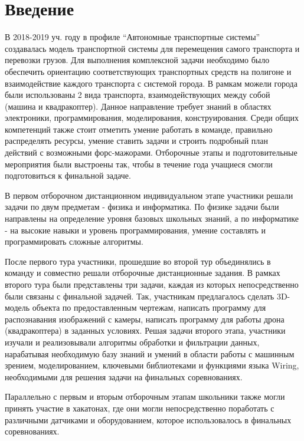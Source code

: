 %

\section*{Введение}

В 2018-2019 уч. году в профиле “Автономные транспортные системы” создавалась модель транспортной системы для перемещения самого транспорта и перевозки грузов. Для выполнения комплексной задачи необходимо было обеспечить ориентацию соответствующих транспортных средств на полигоне и взаимодействие каждого транспорта с системой города. В рамкам можели города были использованы 2 вида транспорта, взаимодействующих между собой (машина и квадракоптер). Данное направление требует знаний в областях электроники, программирования, моделирования, конструирования. Среди общих компетенций также стоит отметить умение работать в команде, правильно распределять ресурсы, умение ставить задачи и строить подробный план действий с возможными форс-мажорами. Отборочные этапы и подготовительные мероприятия были выстроены так, чтобы в течение года учащиеся смогли подготовиться к финальной задаче. 

В первом отборочном дистанционном индивидуальном этапе участники решали задачи по двум предметам - физика и информатика. По физике задачи были направлены на определение уровня базовых школьных знаний, а по информатике - на высокие навыки и уровень программирования, умение составлять и программировать сложные алгоритмы.

После первого тура участники, прошедшие во второй тур объединялись в команду и совместно решали отборочные дистанционные задания. В рамках второго тура были представлены три задачи, каждая из которых непосредственно были связаны с финальной задачей. Так, участникам предлагалось сделать 3D-модель объекта по предоставленным чертежам, написать программу для распознавания изображений с камеры, написать программу для работы дрона (квадракоптера) в заданных условиях. Решая задачи второго этапа, участники изучали и реализовывали алгоритмы обработки и фильтрации данных, нарабатывая необходимую базу знаний и умений в области работы с машинным зрением, моделированием, ключевыми библиотеками и функциями языка Wiring, необходимыми для решения задачи на финальных соревнованиях.

Параллельно с первым и вторым отборочным этапам школьники также могли принять участие в хакатонах, где они могли непосредственно поработать с различными датчиками и оборудованием, которое использовалось в финальных соревнованиях.

